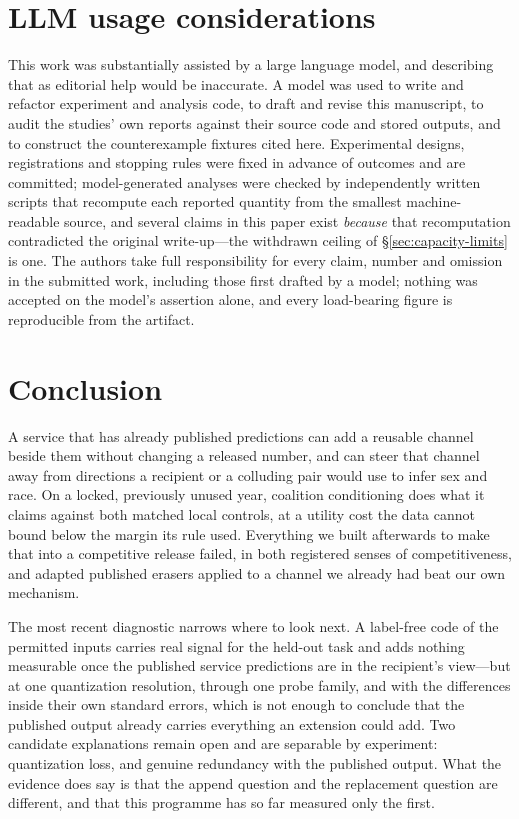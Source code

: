 \documentclass[conference]{IEEEtran}
\begin{document}
\section{LLM usage considerations}
\label{sec:llm}

This work was substantially assisted by a large language model, and describing that as editorial help
would be inaccurate. A model was used to write and refactor experiment and analysis code, to draft and
revise this manuscript, to audit the studies' own reports against their source code and stored outputs,
and to construct the counterexample fixtures cited here. Experimental designs, registrations and stopping
rules were fixed in advance of outcomes and are committed; model-generated analyses were checked by
independently written scripts that recompute each reported quantity from the smallest machine-readable
source, and several claims in this paper exist \emph{because} that recomputation contradicted the
original write-up---the withdrawn ceiling of \S\ref{sec:capacity-limits} is one. The authors take full
responsibility for every claim, number and omission in the submitted work, including those first drafted
by a model; nothing was accepted on the model's assertion alone, and every load-bearing figure is
reproducible from the artifact.

\section{Conclusion}

A service that has already published predictions can add a reusable channel beside them without changing
a released number, and can steer that channel away from directions a recipient or a colluding pair would
use to infer sex and race. On a locked, previously unused year, coalition conditioning does what it
claims against both matched local controls, at a utility cost the data cannot bound below the margin its
rule used. Everything we built afterwards to make that into a competitive release failed, in both
registered senses of competitiveness, and adapted published erasers applied to a channel we already had
beat our own mechanism.

The most recent diagnostic narrows where to look next. A label-free code of the permitted inputs carries
real signal for the held-out task and adds nothing measurable once the published service predictions are
in the recipient's view---but at one quantization resolution, through one probe family, and with the
differences inside their own standard errors, which is not enough to conclude that the published output
already carries everything an extension could add. Two candidate explanations remain open and are
separable by experiment: quantization loss, and genuine redundancy with the published output. What the
evidence does say is that the append question and the replacement question are different, and that this
programme has so far measured only the first.
\end{document}
